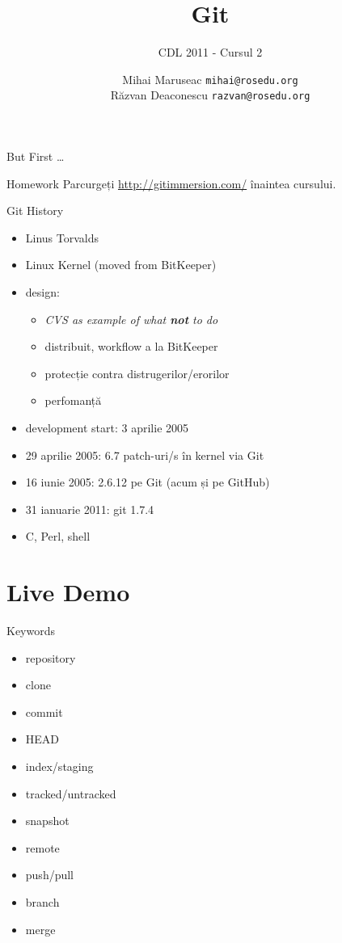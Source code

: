 \documentclass{beamer}
\title[]{Git}
\subtitle{CDL 2011 - Cursul 2}
\institute[]{ROSEdu}
\author[]{
  Mihai Maruseac \texttt{mihai@rosedu.org} \\
  Răzvan Deaconescu \texttt{razvan@rosedu.org}
}
\begin{document}
\maketitle

\begin{frame}{But First \ldots}
  \begin{alertblock}{Homework}
    Parcurgeți \url{http://gitimmersion.com/} înaintea cursului.
  \end{alertblock}
\end{frame}

\begin{frame}{Git History}
  \begin{itemize}
    \item Linus Torvalds
    \item Linux Kernel (moved from BitKeeper)
    \item design:
      \begin{itemize}
        \item \textit{CVS as example of what \textbf{not} to do}
        \item distribuit, workflow a la BitKeeper
        \item protecție contra distrugerilor/erorilor
        \item perfomanță
      \end{itemize}
    \item development start: 3 aprilie 2005
    \item 29 aprilie 2005: 6.7 patch-uri/s în kernel via Git
    \item 16 iunie 2005: 2.6.12 pe Git (acum și pe GitHub)
    \item 31 ianuarie 2011: git 1.7.4
    \item C, Perl, shell
  \end{itemize}
\end{frame}

\section{Live Demo}

\begin{frame}{Keywords}
  \begin{itemize}
    \item repository
    \item clone
    \item commit
    \item HEAD
    \item index/staging
    \item tracked/untracked
    \item snapshot
    \item remote
    \item push/pull
    \item branch
    \item merge
  \end{itemize}
\end{frame}
\end{document}

